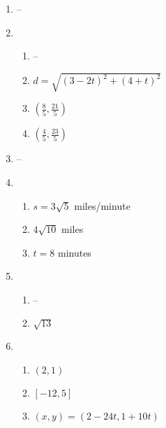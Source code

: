 \documentclass{article}
\begin{document}
\begin{enumerate}
\item --

\item

	\begin{enumerate}
	
	\item --
	
	\item $d = \sqrt{(3 - 2t)^2 + (4 + t)^2}$
	
	\item $(\frac{8}{5}, \frac{21}{5})$
	
	\item $(\frac{4}{5}, \frac{23}{5})$
	
	\end{enumerate}

\item --

\item

	\begin{enumerate}
	
	\item $s = 3\sqrt{5}$ miles/minute
	
	\item $4\sqrt{10}$ miles
	
	\item $t = 8$ minutes
	
	\end{enumerate}

\item

	\begin{enumerate}
	
	\item --
	
	\item $\sqrt{13}$
	
	\end{enumerate}

\item 

	\begin{enumerate}
	
	\item $(2, 1)$
	
	\item $[-12, 5]$
	
	\item $(x,y) = (2 - 24t, 1 + 10t)$
	
	\end{enumerate}


\end{enumerate}
\end{document}
